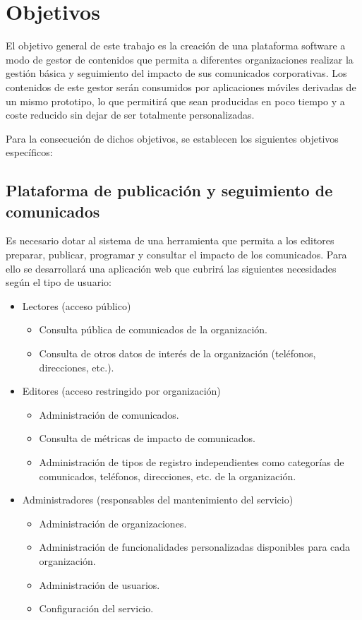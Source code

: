 \chapter{Objetivos}

El objetivo general de este trabajo es la creación de una plataforma software a modo de gestor de contenidos que permita a diferentes organizaciones realizar la gestión básica y seguimiento del impacto de sus comunicados corporativas. Los contenidos de este gestor serán consumidos por aplicaciones móviles derivadas de un mismo prototipo, lo que permitirá que sean producidas en poco tiempo y a coste reducido sin dejar de ser totalmente personalizadas.

Para la consecución de dichos objetivos, se establecen los siguientes objetivos específicos:

\section{Plataforma de publicación y seguimiento de comunicados}\label{objetivos-especificos-gestor-contenidos}
Es necesario dotar al sistema de una herramienta que permita a los editores preparar, publicar, programar y  consultar el impacto de los comunicados. Para ello se desarrollará una aplicación web que cubrirá las siguientes necesidades según el tipo de usuario:
\begin{itemize}
    \item Lectores (acceso público)
    \begin{itemize}
        \item Consulta pública de comunicados de la organización.
        \item Consulta de otros datos de interés de la organización (teléfonos, direcciones, etc.).
    \end{itemize}
    \item Editores (acceso restringido por organización)
    \begin{itemize}
        \item Administración de comunicados.
        \item Consulta de métricas de impacto de comunicados.
        \item Administración de tipos de registro independientes como categorías de comunicados, teléfonos, direcciones, etc. de la organización.
    \end{itemize}
    \item Administradores (responsables del mantenimiento del servicio)
    \begin{itemize}
        \item Administración de organizaciones.
        \item Administración de funcionalidades personalizadas disponibles para cada organización.
        \item Administración de usuarios.
        \item Configuración del servicio.
    \end{itemize}
\end{itemize}

